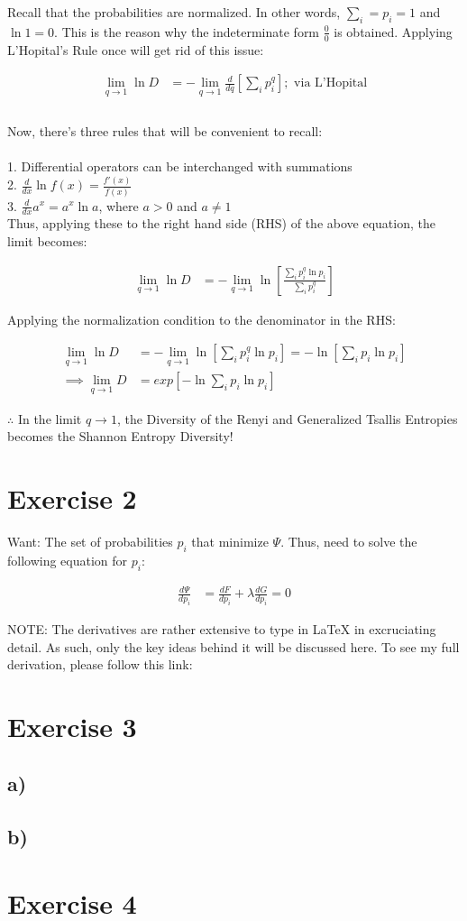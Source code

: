 \documentclass{article}
\begin{document}
Recall that the probabilities are normalized. In other words, $\sum_{i} = p_i = 1$ and $\ln{1} = 0$. This is the reason why the indeterminate form $\frac{0}{0}$ is obtained. Applying L'Hopital's Rule once will get rid of this issue:

\begin{align}
\lim_{q\to1} \ln D &=  -\lim_{q\to1} \frac{d}{dq} [\sum_i p_i^q] ; \text{ via L'Hopital} \\
\end{align}
\\
Now, there's three rules that will be convenient to recall: \\
\\
1. Differential operators can be interchanged with summations \\
2. $\frac{d}{dx} \ln f(x) = \frac{f'(x)}{f(x)}$ \\
3. $\frac{d}{dx} a^x = a^x \ln a$, where $a>0$ and $a\neq1$ \\

Thus, applying these to the right hand side (RHS) of the above equation, the limit becomes:

\begin{align}
\lim_{q\to1} \ln D &= -\lim_{q\to1} \ln[\frac{\sum_i p_i^q \ln p_i}{\sum_i p_i^q}]
 \end{align}

Applying the normalization condition to the denominator in the RHS:

\begin{align}
\lim_{q\to1} \ln D &= -\lim_{q\to1} \ln [\sum_i p_i^q \ln p_i] = -\ln [\sum_i p_i \ln p_i] \\
\implies \lim_{q\to1} D &= exp[-\ln \sum_i p_i \ln p_i]
\end{align}

$\therefore$ In the limit $q\to1$, the Diversity of the Renyi and Generalized Tsallis Entropies becomes the Shannon Entropy Diversity!

\section{Exercise 2}

Want: The set of probabilities $p_i$ that minimize $\Psi$. Thus, need to solve the following equation for $p_i$:

\begin{align}
\frac{d\Psi}{dp_i} &= \frac{dF}{dp_i} + \lambda \frac{dG}{dp_i} = 0
\end{align}

NOTE: The derivatives are rather extensive to type in LaTeX in excruciating detail. As such, only the key ideas behind it will be discussed here. To see my full derivation, please follow this link: \url{} 

\section{Exercise 3}
\subsection{a)}
\subsection{b)}
\section{Exercise 4}
\end{document}
